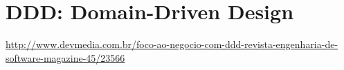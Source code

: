 \chapter{DDD: Domain-Driven Design}

\url{http://www.devmedia.com.br/foco-ao-negocio-com-ddd-revista-engenharia-de-software-magazine-45/23566}
